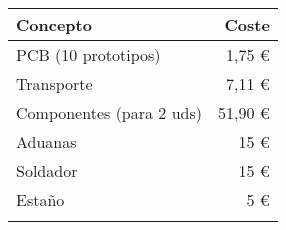 \begin{longtable}[]{@{}lr@{}}
\toprule
\begin{minipage}[b]{0.38\columnwidth}\raggedright\strut
\textbf{Concepto}\strut
\end{minipage} & \begin{minipage}[b]{0.20\columnwidth}\raggedright\strut
\textbf{Coste}\strut
\end{minipage}\tabularnewline
\midrule
\endhead
\begin{minipage}[t]{0.38\columnwidth}\raggedright\strut
PCB (10 prototipos)\strut
\end{minipage} & \begin{minipage}[t]{0.20\columnwidth}\raggedright\strut
1,75 \euro{}\strut
\end{minipage}\tabularnewline
\begin{minipage}[t]{0.38\columnwidth}\raggedright\strut
Transporte\strut
\end{minipage} & \begin{minipage}[t]{0.20\columnwidth}\raggedright\strut
7,11 \euro{}\strut
\end{minipage}\tabularnewline
\begin{minipage}[t]{0.38\columnwidth}\raggedright\strut
Componentes (para 2 uds)\strut
\end{minipage} & \begin{minipage}[t]{0.20\columnwidth}\raggedright\strut
51,90 \euro{}\strut
\end{minipage}\tabularnewline
\begin{minipage}[t]{0.38\columnwidth}\raggedright\strut
Aduanas\strut
\end{minipage} & \begin{minipage}[t]{0.20\columnwidth}\raggedright\strut
15 \euro{}\strut
\end{minipage}\tabularnewline
\begin{minipage}[t]{0.38\columnwidth}\raggedright\strut
Soldador\strut
\end{minipage} & \begin{minipage}[t]{0.20\columnwidth}\raggedright\strut
15 \euro{}\strut
\end{minipage}\tabularnewline
\begin{minipage}[t]{0.38\columnwidth}\raggedright\strut
Estaño\strut
\end{minipage} & \begin{minipage}[t]{0.20\columnwidth}\raggedright\strut
5 \euro{}\strut
\end{minipage}\tabularnewline
\begin{minipage}[t]{0.38\columnwidth}\raggedright\strut

\end{minipage}
\end{longtable}
